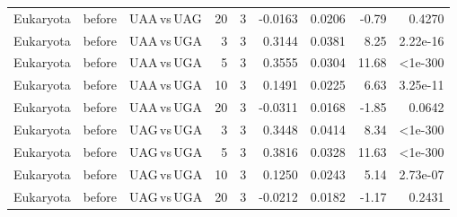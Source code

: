 \begin{longtable}{lllrlrrrr}
Eukaryota & before & UAA$\,$vs$\,$UAG & 20 & 3 & -0.0163 & 0.0206 & -0.79 & 0.4270 \\
Eukaryota & before & UAA$\,$vs$\,$UGA & 3 & 3 & 0.3144 & 0.0381 & 8.25 & 2.22e-16 \\
Eukaryota & before & UAA$\,$vs$\,$UGA & 5 & 3 & 0.3555 & 0.0304 & 11.68 & <1e-300 \\
Eukaryota & before & UAA$\,$vs$\,$UGA & 10 & 3 & 0.1491 & 0.0225 & 6.63 & 3.25e-11 \\
Eukaryota & before & UAA$\,$vs$\,$UGA & 20 & 3 & -0.0311 & 0.0168 & -1.85 & 0.0642 \\
Eukaryota & before & UAG$\,$vs$\,$UGA & 3 & 3 & 0.3448 & 0.0414 & 8.34 & <1e-300 \\
Eukaryota & before & UAG$\,$vs$\,$UGA & 5 & 3 & 0.3816 & 0.0328 & 11.63 & <1e-300 \\
Eukaryota & before & UAG$\,$vs$\,$UGA & 10 & 3 & 0.1250 & 0.0243 & 5.14 & 2.73e-07 \\
Eukaryota & before & UAG$\,$vs$\,$UGA & 20 & 3 & -0.0212 & 0.0182 & -1.17 & 0.2431 \\
\bottomrule
\end{longtable}
\endgroup

